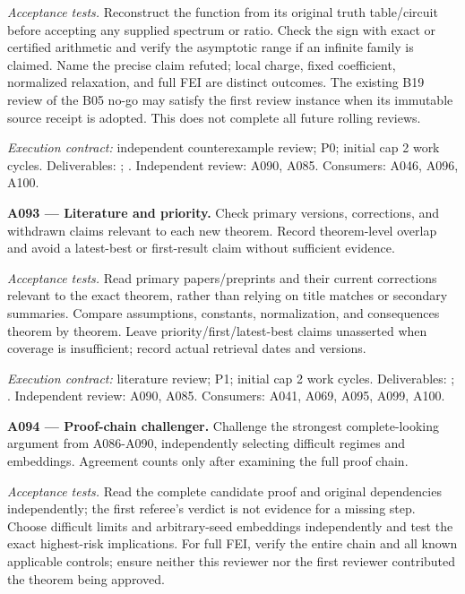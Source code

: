 \documentclass[11pt]{article}
\begin{document}
\emph{Acceptance tests.} Reconstruct the function from its original truth table/circuit before accepting any supplied spectrum or ratio. Check the sign with exact or certified arithmetic and verify the asymptotic range if an infinite family is claimed. Name the precise claim refuted; local charge, fixed coefficient, normalized relaxation, and full FEI are distinct outcomes. The existing B19 review of the B05 no-go may satisfy the first review instance when its immutable source receipt is adopted. This does not complete all future rolling reviews.

{\small\emph{Execution contract:} independent counterexample review; P0; initial cap 2 work cycles. Deliverables: ; . Independent review: A090, A085. Consumers: A046, A096, A100.}

\textbf{A093 --- Literature and priority.} Check primary versions, corrections, and withdrawn claims relevant to each new theorem. Record theorem-level overlap and avoid a latest-best or first-result claim without sufficient evidence.

\emph{Acceptance tests.} Read primary papers/preprints and their current corrections relevant to the exact theorem, rather than relying on title matches or secondary summaries. Compare assumptions, constants, normalization, and consequences theorem by theorem. Leave priority/first/latest-best claims unasserted when coverage is insufficient; record actual retrieval dates and versions.

{\small\emph{Execution contract:} literature review; P1; initial cap 2 work cycles. Deliverables: ; . Independent review: A090, A085. Consumers: A041, A069, A095, A099, A100.}

\textbf{A094 --- Proof-chain challenger.} Challenge the strongest complete-looking argument from A086-A090, independently selecting difficult regimes and embeddings. Agreement counts only after examining the full proof chain.

\emph{Acceptance tests.} Read the complete candidate proof and original dependencies independently; the first referee's verdict is not evidence for a missing step. Choose difficult limits and arbitrary-seed embeddings independently and test the exact highest-risk implications. For full FEI, verify the entire chain and all known applicable controls; ensure neither this reviewer nor the first reviewer contributed the theorem being approved.
\end{document}
